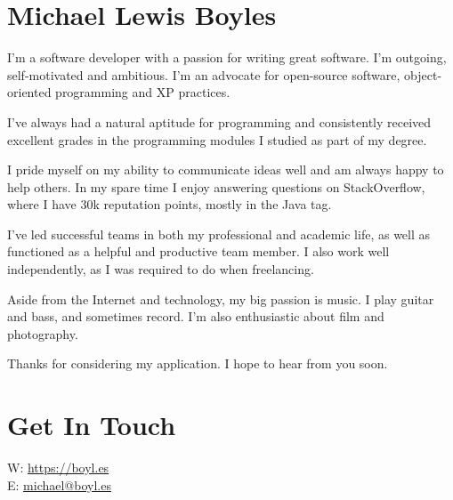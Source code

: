 \documentclass{article}
\begin{document}
\begin{minipage}[t]{0.24\linewidth}
\section*{Michael Lewis Boyles}

\vspace{0.2cm}I’m a software developer with a passion for writing great software. I’m outgoing, self-motivated and ambitious. I’m an advocate for open-source software, object-oriented programming and XP practices. 

\vspace{0.2cm}I’ve always had a natural aptitude for programming and consistently received excellent grades in the programming modules I studied as part of my degree.

\vspace{0.2cm}I pride myself on my ability to communicate ideas well and am always happy to help others. In my spare time I enjoy answering questions on StackOverflow, where I have 30k reputation points, mostly in the Java tag.

\vspace{0.2cm}I’ve led successful teams in both my professional and academic life, as well as functioned as a helpful and productive team member. I also work well independently, as I was required to do when freelancing.

\vspace{0.2cm}Aside from the Internet and technology, my big passion is music. I play guitar and bass, and sometimes record. I’m also enthusiastic about film and photography.

\vspace{0.2cm}Thanks for considering my application. I hope to hear from you soon.

\section*{Get In Touch}

W: \href{https://boyl.es}{https://boyl.es}\\
E: \href{mailto:michael@boyl.es}{michael@boyl.es}

\end{minipage}
\hspace{0.5cm}
\end{document}
